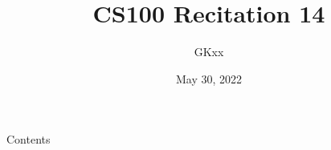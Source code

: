 \documentclass{beamer}
\title{CS100 Recitation 14}
\author{GKxx}
\date{May 30, 2022}
\begin{document}
\begin{frame}
    \maketitle
\end{frame}

\begin{frame}{Contents}
    \tableofcontents
\end{frame}






\end{document}
